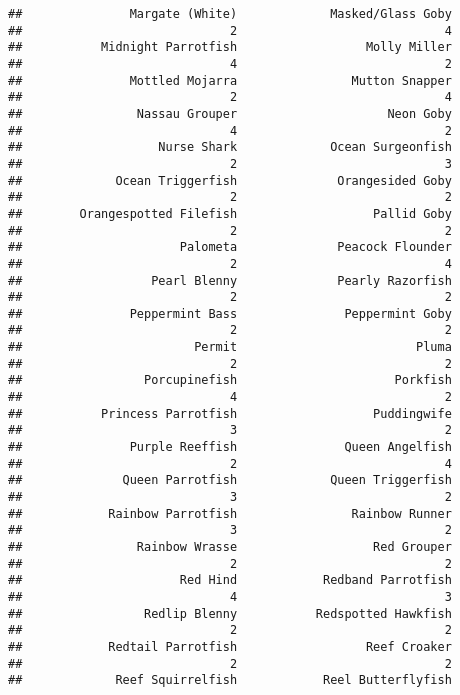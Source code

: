 \documentclass[
]{article}
\begin{document}
\begin{verbatim}
##               Margate (White)             Masked/Glass Goby 
##                             2                             4 
##           Midnight Parrotfish                  Molly Miller 
##                             4                             2 
##               Mottled Mojarra                Mutton Snapper 
##                             2                             4 
##                Nassau Grouper                     Neon Goby 
##                             4                             2 
##                   Nurse Shark             Ocean Surgeonfish 
##                             2                             3 
##             Ocean Triggerfish              Orangesided Goby 
##                             2                             2 
##        Orangespotted Filefish                   Pallid Goby 
##                             2                             2 
##                      Palometa              Peacock Flounder 
##                             2                             4 
##                  Pearl Blenny              Pearly Razorfish 
##                             2                             2 
##               Peppermint Bass               Peppermint Goby 
##                             2                             2 
##                        Permit                         Pluma 
##                             2                             2 
##                 Porcupinefish                      Porkfish 
##                             4                             2 
##           Princess Parrotfish                   Puddingwife 
##                             3                             2 
##               Purple Reeffish               Queen Angelfish 
##                             2                             4 
##              Queen Parrotfish             Queen Triggerfish 
##                             3                             2 
##            Rainbow Parrotfish                Rainbow Runner 
##                             3                             2 
##                Rainbow Wrasse                   Red Grouper 
##                             2                             2 
##                      Red Hind            Redband Parrotfish 
##                             4                             3 
##                 Redlip Blenny           Redspotted Hawkfish 
##                             2                             2 
##            Redtail Parrotfish                  Reef Croaker 
##                             2                             2 
##             Reef Squirrelfish            Reel Butterflyfish 

\end{verbatim}
\end{document}
